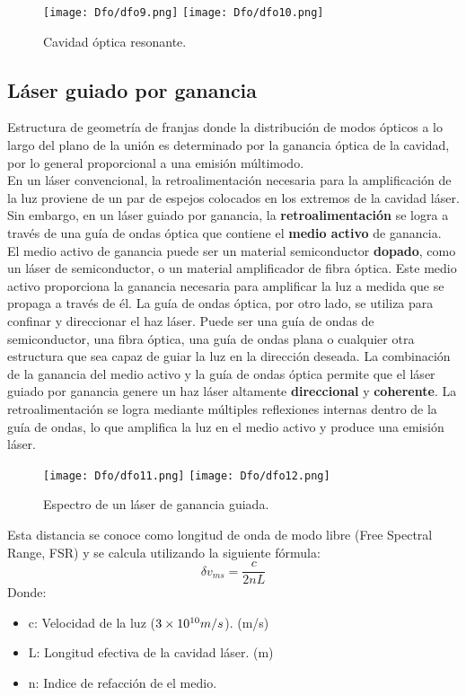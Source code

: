 \documentclass[12pt,fleqn,a4paper,oneside]{LegrandOrangeBook}
\begin{document}
\begin{figure}[H]
\centering
\texttt{[image: Dfo/dfo9.png]}
\texttt{[image: Dfo/dfo10.png]}
\caption{Cavidad óptica resonante.}
\end{figure}
\subsection{Láser guiado por ganancia}
Estructura de geometría de franjas donde la distribución de modos ópticos a lo  largo del plano de la unión es determinado por la ganancia óptica de la cavidad, por lo general proporcional a una emisión múltimodo.\\
En un láser convencional, la retroalimentación necesaria para la amplificación de la luz proviene de un par de espejos colocados en los extremos de la cavidad láser. Sin embargo, en un láser guiado por ganancia, la \textbf{retroalimentación} se logra a través de una guía de ondas óptica que contiene el \textbf{medio activo} de ganancia.\\
El medio activo de ganancia puede ser un material semiconductor \textbf{dopado}, como un láser de semiconductor, o un material amplificador de fibra óptica. Este medio activo proporciona la ganancia necesaria para amplificar la luz a medida que se propaga a través de él. La guía de ondas óptica, por otro lado, se utiliza para confinar y direccionar el haz láser. Puede ser una guía de ondas de semiconductor, una fibra óptica, una guía de ondas plana o cualquier otra estructura que sea capaz de guiar la luz en la dirección deseada. La combinación de la ganancia del medio activo y la guía de ondas óptica permite que el láser guiado por ganancia genere un haz láser altamente \textbf{direccional} y \textbf{coherente}. La retroalimentación se logra mediante múltiples reflexiones internas dentro de la guía de ondas, lo que amplifica la luz en el medio activo y produce una emisión láser.
\begin{figure}[H]
\centering
\texttt{[image: Dfo/dfo11.png]}
\texttt{[image: Dfo/dfo12.png]}
\caption{Espectro de un láser de ganancia guiada.}
\end{figure}
\begin{definition}
Esta distancia se conoce como longitud de onda de modo libre (Free Spectral Range, FSR) y se calcula utilizando la siguiente fórmula:
\begin{equation}
\delta v_{ms}=\frac{c}{2nL}
\end{equation}
Donde:
\begin{itemize}
\item c: Velocidad de la luz ($3\times 10^{10} m/s$). (m/s)
\item L: Longitud efectiva de la cavidad láser. (m)
\item n: Indice de refacción de el medio.
\end{itemize}
\end{definition}
\end{document}
